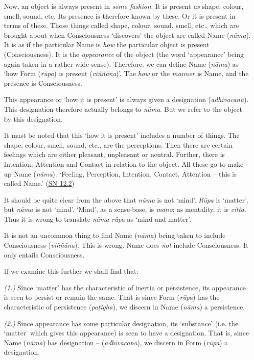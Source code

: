 Now, an object is always present in \emph{some fashion}. It is present \emph{as} shape, colour, smell, sound, etc. Its presence is therefore known by these. Or it is present in terms of these. Those things called shape, colour, sound, smell, etc., which are brought about when Consciousness `discovers' the object are called Name (\textit{nāma}). It is as if the particular Name is \emph{how} the particular object is present (Consciousness). It is the \emph{appearance} of the object (the word `appearance' being again taken in a rather wide sense). Therefore, we can define Name (\textit{nāma}) as `how Form (\textit{rūpa}) is present (\textit{viññāna})'. The \emph{how} or the \emph{manner} is Name, and the presence is Consciousness.

This appearance or `how it is present' is always given a designation (\textit{adhivacana}). This designation therefore actually belongs to \textit{nāma}. But we refer to the object by this designation.

It must be noted that this `how it is present' includes a number of things. The shape, colour, smell, sound, etc., are the perceptions. Then there are certain feelings which are either pleasant, unpleasant or neutral. Further, there is Intention, Attention and Contact in relation to the object. All these go to make up Name (\textit{nāma}). `Feeling, Perception, Intention, Contact, Attention -- this is called Name.' (\href{https://suttacentral.net/sn12.2/en/bodhi}{SN 12.2})

It should be quite clear from the above that \textit{nāma} is not `mind'. \textit{Rūpa} is `matter', but \textit{nāma} is not `mind'. `Mind', as a sense-base, is \textit{mano}; as mentality, it is \textit{citta}. Thus it is wrong to translate \textit{nāma-rūpa} as `mind-and-matter'.

It is not an uncommon thing to find Name (\textit{nāma}) being taken to include Consciousness (\textit{viññāna}). This is wrong. Name does \emph{not} include Consciousness. It only entails Consciousness.

If we examine this further we shall find that:

\emph{(1.)} Since `matter' has the characteristic of inertia or persistence, its appearance is seen to persist or remain the same. That is since Form (\textit{rūpa}) has the characteristic of persistence (\textit{paṭigha}), we discern in Name (\textit{nāma}) a persistence.

\emph{(2.)} Since appearance has some particular designation, its `substance' (i.e. the `matter' which gives this appearance) is seen to have a designation. That is, since Name (\textit{nāma}) has designation -- (\textit{adhivacana}), we discern in Form (\textit{rūpa}) a designation.

